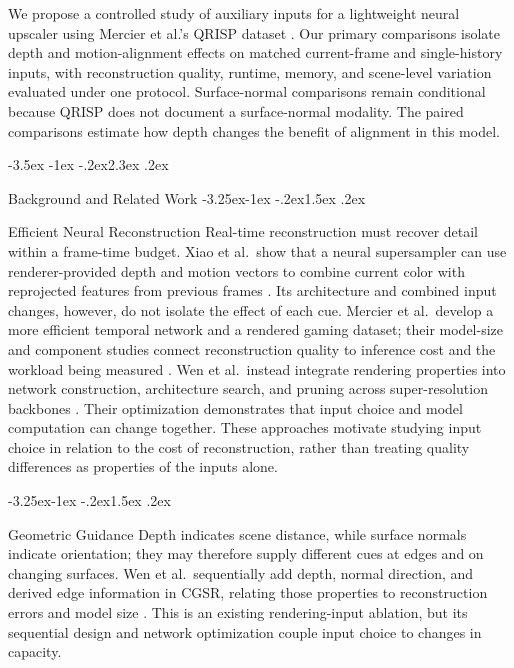 \documentclass[11pt,a4paper]{article}
\makeatletter
\renewcommand\section{\@startsection{section}{1}{\z@}%
  {-3.5ex \@plus -1ex \@minus -.2ex}{2.3ex \@plus .2ex}%
  {\normalfont\Large\bfseries\raggedright}}
\renewcommand\subsection{\@startsection{subsection}{2}{\z@}%
  {-3.25ex\@plus -1ex \@minus -.2ex}{1.5ex \@plus .2ex}%
  {\normalfont\large\bfseries\raggedright}}
\makeatother
\begin{document}
We propose a controlled study of auxiliary inputs for a lightweight neural
upscaler using Mercier et al.'s QRISP dataset
\cite{mercier2023efficient}. Our primary comparisons isolate depth and
motion-alignment effects on matched current-frame and single-history
inputs, with reconstruction quality, runtime, memory, and scene-level
variation evaluated under one protocol. Surface-normal comparisons remain
conditional because QRISP does not document a surface-normal modality.
The paired comparisons estimate how depth changes the benefit of
alignment in this model.

\section{Background and Related Work}
\subsection{Efficient Neural Reconstruction}
Real-time reconstruction must recover detail within a frame-time budget.
Xiao et al.\ show that a neural supersampler can use renderer-provided depth
and motion vectors to combine current color with reprojected features from
previous frames \cite{xiao2020neural}. Its architecture and combined input
changes, however, do not isolate the effect of each cue. Mercier et
al.\ develop a more efficient temporal network and a rendered gaming dataset;
their model-size and component studies connect reconstruction quality to
inference cost and the workload being measured \cite{mercier2023efficient}.
Wen et al.\ instead integrate rendering properties into network construction,
architecture search, and pruning across super-resolution backbones
\cite{wen2025cgsr}. Their optimization demonstrates that input choice and
model computation can change together. These approaches motivate studying
input choice in relation to the cost of reconstruction, rather than treating
quality differences as properties of the inputs alone.

\subsection{Geometric Guidance}
Depth indicates scene distance, while surface normals indicate orientation;
they may therefore supply different cues at edges and on changing surfaces.
Wen et al.\ sequentially add depth, normal direction, and derived edge
information in CGSR, relating those properties to reconstruction errors and
model size \cite{wen2025cgsr}. This is an existing rendering-input ablation,
but its sequential design and network optimization couple input choice to
changes in capacity.
\end{document}

